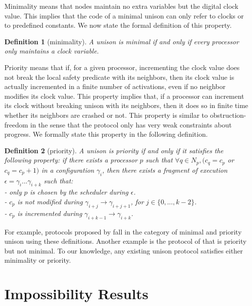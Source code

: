 \documentclass[11pt,english,letterpaper]{article}
\newtheorem{definition}{Definition}
\begin{document}
Minimality means that nodes maintain no extra variables but the digital clock value. This implies that the code of a minimal unison can only refer to clocks or to predefined constants. We now state the formal definition of this property.

\begin{definition}[minimality]
A unison is \emph{minimal} if and only if every processor only maintains a clock variable.
\end{definition}

Priority means that if, for a given processor, incrementing the clock value does not break the local safety predicate with its neighbors, then its clock value is actually incremented in a finite number of activations, even if no neighbor modifies its clock value. This property implies that, if a processor can increment its clock without breaking unison with its neighbors, then it does so in finite time whether its neighbors are crashed or not. This property is similar to obstruction-freedom in the sense that the protocol only has very weak constraints about progress. We formally state this property in the following definition.

\begin{definition}[priority]
A unison is \emph{priority} if and only if it satisfies the following property: if there exists a processor $p$ such that $\forall q\in N_{p},(c_{q}=c_{p}$ or $c_{q}=c_{p}+1)$ in a configuration $\gamma_{i}$, then there exists a fragment of execution $\epsilon=\gamma_{i}...\gamma_{i+k}$ such that:\\
\indent - only $p$ is chosen by the scheduler during $\epsilon$.\\
\indent - $c_{p}$ is not modified during $\gamma_{i+j}\longrightarrow\gamma_{i+j+1}$, for $j\in\{0,...,k-2\}$.\\
\indent - $c_{p}$ is incremented during $\gamma_{i+k-1}\longrightarrow\gamma_{i+k}$.
\end{definition}
	
For example, protocols proposed by \cite{BPV04c,BPV05c,CFG92c,GH90j} fall in the category of minimal and priority unison using these definitions. Another example is the protocol of \cite{PT97j} that is priority but not minimal. To our knowledge, any existing unison protocol satisfies either minimality or priority.

\section{Impossibility Results}\label{sec:negative}
\end{document}
